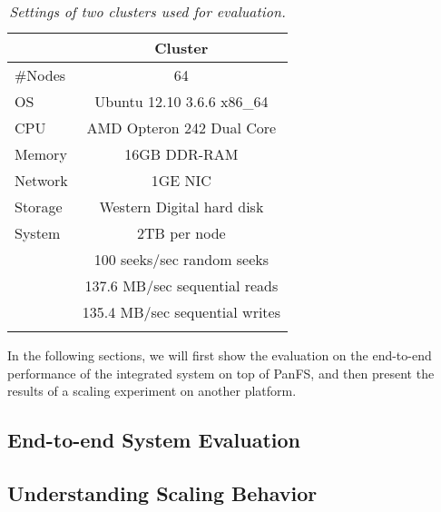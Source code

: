\begin{footnotesize}
\begin{table}
\center
\begin{tabular}{lc}
\toprule
      & Cluster \\
\midrule
\#Nodes & 64 \\
\hline
OS &    Ubuntu 12.10 3.6.6 x86\_64 \\
\hline
CPU &  AMD Opteron 242 Dual Core\\
\hline
Memory & 16GB DDR-RAM\\
\hline
Network & 1GE NIC  \\
\hline
Storage & Western Digital hard disk \\
System & 2TB per node  \\
& 100 seeks/sec random seeks   \\
& 137.6 MB/sec sequential reads \\
& 135.4 MB/sec sequential writes \\
\bottomrule \\
\end{tabular}
\caption{
\textit{\footnotesize Settings of two clusters used for evaluation.}
}
\label{tab:setting}
\end{table}
\end{footnotesize}

In the following sections, we will first show the evaluation
on the end-to-end performance of the integrated system on top of PanFS,
and then present the results of a scaling experiment on another platform.

\subsection{End-to-end System Evaluation}
\label{sec:fullsystem}


\subsection{Understanding Scaling Behavior}

